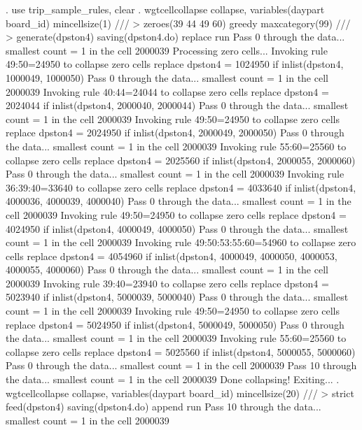 . use trip_sample_rules, clear
{\smallskip}
. wgtcellcollapse collapse, variables(daypart board_id) mincellsize(1) ///
>         zeroes(39 44 49 60) greedy maxcategory(99) ///
>         generate(dpston4) saving(dpston4.do) replace run
Pass 0 through the data...
  smallest count = 1 in the cell      2000039
{\smallskip}
Processing zero cells...
{\smallskip}
  Invoking rule 49:50=24950 to collapse zero cells
  replace dpston4 = 1024950 if inlist(dpston4, 1000049, 1000050)
Pass 0 through the data...
  smallest count = 1 in the cell      2000039
  Invoking rule 40:44=24044 to collapse zero cells
  replace dpston4 = 2024044 if inlist(dpston4, 2000040, 2000044)
Pass 0 through the data...
  smallest count = 1 in the cell      2000039
  Invoking rule 49:50=24950 to collapse zero cells
  replace dpston4 = 2024950 if inlist(dpston4, 2000049, 2000050)
Pass 0 through the data...
  smallest count = 1 in the cell      2000039
  Invoking rule 55:60=25560 to collapse zero cells
  replace dpston4 = 2025560 if inlist(dpston4, 2000055, 2000060)
Pass 0 through the data...
  smallest count = 1 in the cell      2000039
  Invoking rule 36:39:40=33640 to collapse zero cells
  replace dpston4 = 4033640 if inlist(dpston4, 4000036, 4000039, 4000040)
Pass 0 through the data...
  smallest count = 1 in the cell      2000039
  Invoking rule 49:50=24950 to collapse zero cells
  replace dpston4 = 4024950 if inlist(dpston4, 4000049, 4000050)
Pass 0 through the data...
  smallest count = 1 in the cell      2000039
  Invoking rule 49:50:53:55:60=54960 to collapse zero cells
  replace dpston4 = 4054960 if inlist(dpston4, 4000049, 4000050, 4000053, 4000055, 4000060)
Pass 0 through the data...
  smallest count = 1 in the cell      2000039
  Invoking rule 39:40=23940 to collapse zero cells
  replace dpston4 = 5023940 if inlist(dpston4, 5000039, 5000040)
Pass 0 through the data...
  smallest count = 1 in the cell      2000039
  Invoking rule 49:50=24950 to collapse zero cells
  replace dpston4 = 5024950 if inlist(dpston4, 5000049, 5000050)
Pass 0 through the data...
  smallest count = 1 in the cell      2000039
  Invoking rule 55:60=25560 to collapse zero cells
  replace dpston4 = 5025560 if inlist(dpston4, 5000055, 5000060)
Pass 0 through the data...
  smallest count = 1 in the cell      2000039
Pass 10 through the data...
  smallest count = 1 in the cell      2000039
  Done collapsing! Exiting...
{\smallskip}
. wgtcellcollapse collapse, variables(daypart board_id) mincellsize(20) ///
>         strict feed(dpston4) saving(dpston4.do) append run
Pass 10 through the data...
  smallest count = 1 in the cell      2000039
